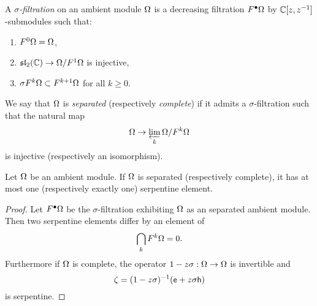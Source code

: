 \subsection{}
\begin{defn}\label{defn:complete} A \emph{$\sigma$-filtration} on an ambient module $\Omega$ is a
        decreasing filtration $F^\bullet\Omega$ by ${\mathbb{C}}[z,z^{-1}]$-submodules such that:
\begin{enumerate}
        \item  $F^0\Omega=\Omega$,
        \item  $\mathfrak{sl}_2({\mathbb{C}})\to\Omega/F^1\Omega$ is injective,
        \item  $\sigma F^k \Omega \subset F^{k+1} \Omega$ for all $k\ge0$.
\end{enumerate}
We say that $\Omega$ is \emph{separated} (respectively \emph{complete}) if it
admits a $\sigma$-filtration such that the natural map
\[
    \Omega \to \varprojlim_k \Omega/F^k\Omega
\]
is injective (respectively an isomorphism).
\end{defn}

\begin{lem}
Let $\Omega$ be an ambient module. If $\Omega$ is separated (respectively
complete), it has at most one (respectively exactly one) serpentine
element.
\end{lem}

\begin{proof}
Let $F^\bullet\Omega$ be the $\sigma$-filtration exhibiting $\Omega$ as an separated ambient
module. Then two serpentine elements differ by an element of 
\[
   \bigcap_k F^k\Omega=0.
\]
Furthermore if $\Omega$ is complete, the operator $1 - z \sigma : \Omega\to\Omega$ is invertible
and
\[
        \zeta = (1 - z \sigma)^{-1} (\mathsf{e} + z \sigma \mathsf{h})
\]
is serpentine.
\end{proof}

